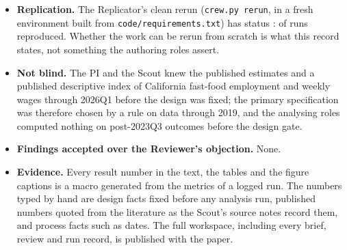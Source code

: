 \begin{itemize}
        \CrewRunsDataPrep{} data preparation); \CrewRunsSuperseded{} were replaced by a
        later run with the same id and archived (the first data fetch, replaced to drop two metrics that a clean rerun could not reproduce, and the
        first run of the method checks, whose failures led to the design changes described above; no run behind
        a result claim was replaced); \CrewRunsUnreviewed{} analysis runs were not covered
        by a passing code review, both after the fourth and last code-review round and both
        with the human author's consent in chat: the post hoc run (deviation D7), whose
        code was changed to add the leave-one-out check the Reviewer asked for, and the
        descriptive run behind the summary-statistics table (deviation D8), added at the
        paper stage. The second and third results-review rounds read the post hoc run's
        code and outputs after it ran; the paper review read the descriptive run's code and
        outputs.
  \item \textbf{Replication.} The Replicator's clean rerun (\texttt{crew.py rerun}, in a
        fresh environment built from \texttt{code/requirements.txt}) has status
        \CrewRerunStatus{}: \CrewRerunReproduced{} of \CrewRerunTotal{} runs reproduced.
        Whether the work can be rerun from scratch is what this record states, not
        something the authoring roles assert.
  \item \textbf{Not blind.} The PI and the Scout knew the published estimates and a
        published descriptive index of California fast-food employment and weekly wages
        through 2026Q1 before the design was fixed; the primary specification was
        therefore chosen by a rule on data through 2019, and the analysing roles computed
        nothing on post-2023Q3 outcomes before the design gate.
  \item \textbf{Findings accepted over the Reviewer's objection.} None.
  \item \textbf{Evidence.} Every result number in the text, the tables and the figure
        captions is a macro generated from the metrics of a logged run. The numbers typed
        by hand are design facts fixed before any analysis run, published numbers quoted
        from the literature as the Scout's source notes record them, and process facts
        such as dates. The full workspace, including every brief, review and run record, is
        published with the paper.
\end{itemize}
